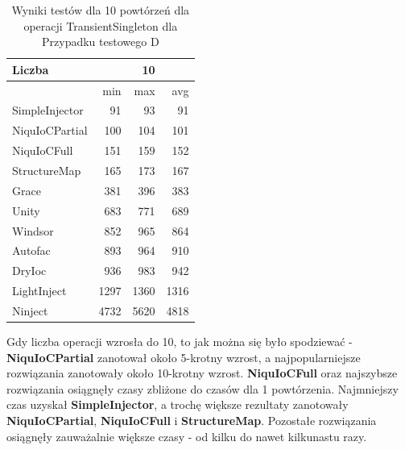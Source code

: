 \documentclass[12pt]{article}
\begin{document}
\begin{table}[H]
\captionsetup{belowskip=0pt,aboveskip=0pt}
\begin{center}
\begin{small}
	\begin{tabular}{ | l | r r r | }
    		\hline
Liczba & & 10 & \\ \hline
 & min & max & avg \\ \hline
SimpleInjector & 91 & 93 & 91 \\ \hline
NiquIoCPartial & 100 & 104 & 101 \\ \hline
NiquIoCFull & 151 & 159 & 152 \\ \hline
StructureMap & 165 & 173 & 167 \\ \hline
Grace & 381 & 396 & 383 \\ \hline
Unity & 683 & 771 & 689 \\ \hline
Windsor & 852 & 965 & 864 \\ \hline
Autofac & 893 & 964 & 910 \\ \hline
DryIoc & 936 & 983 & 942 \\ \hline
LightInject & 1297 & 1360 & 1316 \\ \hline
Ninject & 4732 & 5620 & 4818 \\ \hline
  	\end{tabular}
\end{small}
\end{center}
\caption{Wyniki testów dla 10 powtórzeń dla operacji TransientSingleton dla Przypadku testowego D}
\label{TestCaseD_TransientSingleton10}
\end{table}
Gdy liczba operacji wzrosła do 10, to jak można się było spodziewać - \textbf{NiquIoCPartial} zanotował około 5-krotny wzrost, a najpopularniejsze rozwiązania zanotowały około 10-krotny wzrost. \textbf{NiquIoCFull} oraz najszybsze rozwiązania osiągnęły czasy zbliżone do czasów dla 1 powtórzenia. Najmniejszy czas uzyskał \textbf{SimpleInjector}, a trochę większe rezultaty zanotowały \textbf{NiquIoCPartial}, \textbf{NiquIoCFull} i \textbf{StructureMap}. Pozostałe rozwiązania osiągnęły zauważalnie większe czasy - od kilku do nawet kilkunastu razy.
\end{document}
